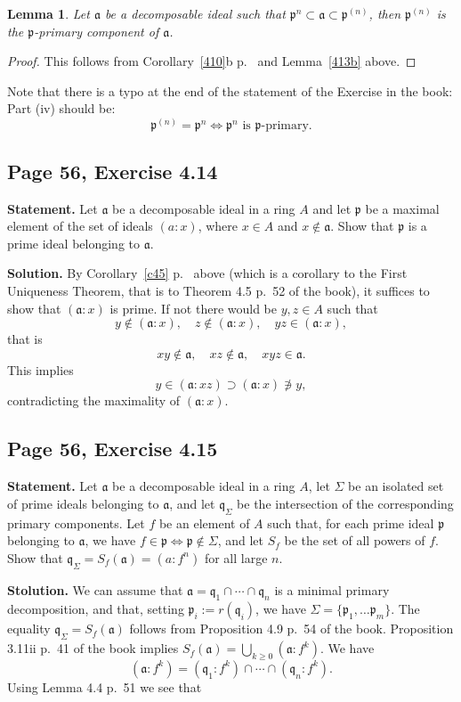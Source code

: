 \documentclass[parskip=half,fontsize=12pt]{scrartcl}%
\newcommand{\mf}{\mathfrak}
\newcommand{\aaa}{\mf a}
\newcommand{\ppp}{\mf p}
\newcommand{\qqq}{\mf q}
\newtheorem{lem}[thm]{Lemma}
\begin{document}
\begin{lem}
Let $\aaa$ be a decomposable ideal such that $\ppp^n\subset\aaa\subset\ppp^{(n)}$, then $\ppp^{(n)}$ is the $\ppp$-primary component of $\aaa$. 
\end{lem}
\begin{proof}
This follows from Corollary~\ref{410}b p.~\pageref{410} and Lemma~\ref{413b} above.
\end{proof}

Note that there is a typo at the end of the statement of the Exercise in the book: Part (iv) should be: 
$$
\ppp^{(n)}=\ppp^n\iff\ppp^n\text{ is }\ppp\text{-primary.}
$$ 

\subsection{Page 56, Exercise 4.14}%

\textbf{Statement.} Let $\aaa$ be a decomposable ideal in a ring $A$ and let $\ppp$ be a maximal element of the set of ideals $(a:x)$, where $x\in A$ and $x\notin\aaa$. Show that $\ppp$ is a prime ideal belonging to $\aaa$.

\textbf{Solution.} By Corollary~\ref{c45} p.~\pageref{c45} above (which is a corollary to the First Uniqueness Theorem, that is to Theorem 4.5 p.~52 of the book), it suffices to show that $(\aaa:x)$ is prime. If not there would be $y,z\in A$ such that 
$$
y\notin(\aaa:x),\quad z\notin(\aaa:x),\quad yz\in(\aaa:x),
$$ 
that is 
$$
xy\notin\aaa,\quad xz\notin\aaa,\quad xyz\in\aaa.
$$ 
This implies 
$$
y\in(\aaa:xz)\supset(\aaa:x)\not\ni y,
$$ 
contradicting the maximality of $(\aaa:x)$.%

\subsection{Page 56, Exercise 4.15}%

\textbf{Statement.} Let $\aaa$ be a decomposable ideal in a ring $A$, let $\Sigma$ be an isolated set of prime ideals belonging to $\aaa$, and let $\qqq_\Sigma$ be the intersection of the corresponding primary components. Let $f$ be an element of $A$ such that, for each prime ideal $\ppp$ belonging to $\aaa$, we have $f\in\ppp\iff\ppp\notin\Sigma$, and let $S_f$ be the set of all powers of $f$. Show that $\qqq_\Sigma=S_f(\aaa)=(a:f^n)$ for all large $n$.

\textbf{Stolution.} We can assume that $\aaa=\qqq_1\cap\cdots\cap\qqq_n$ is a minimal primary decomposition, and that, setting $\ppp_i:=r(\qqq_i)$, we have $\Sigma=\{\ppp_1,\dots\ppp_m\}$. The equality $\qqq_\Sigma=S_f(\aaa)$ follows from Proposition 4.9 p.~54 of the book. Proposition 3.11ii p.~41 of the book implies $S_f(\aaa)=\bigcup_{k\ge0}(\aaa:f^k)$. We have 
\begin{equation}\label{afk}
(\aaa:f^k)=(\qqq_1:f^k)\cap\cdots\cap(\qqq_n:f^k).
\end{equation} 
Using Lemma 4.4 p.~51 we see that  
\end{document}
